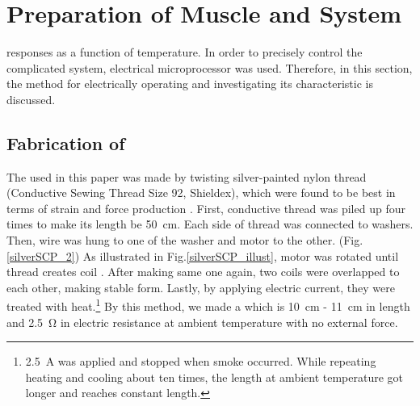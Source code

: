 \section{Preparation of Muscle and System}\label{section_preparation}
\scp responses as a function of temperature. In order to precisely control the complicated system, electrical microprocessor was used. Therefore, in this section, the method for electrically operating \scp and investigating its characteristic is discussed. 

\subsection{Fabrication of \SCP}
The \scp used in this paper was made by twisting silver-painted nylon thread (Conductive Sewing Thread Size 92, Shieldex), which were found to be best in terms of strain and force production \cite{haines}. First, conductive thread was piled up four times to make its length be \SI{50}{\centi\meter}. Each side of thread was connected to washers. Then, wire was hung to one of the washer and motor to the other. (Fig.\ref{silverSCP_2})
As illustrated in Fig.\ref{silverSCP_illust}, motor was rotated until thread creates coil \cite{fab_coil}. After making same one again, two coils were overlapped to each other, making stable form. Lastly, by applying electric current, they were treated with heat.\footnote{\SI{2.5}{\ampere} was applied and stopped when smoke occurred. While repeating heating and cooling about ten times, the length at ambient temperature got longer and reaches constant length.} By this method, we made a \scp which is \SI{10}{\centi\meter} - \SI{11}{\centi\meter} in length and \SI{2.5}{\ohm} in electric resistance at ambient temperature with no external force.

